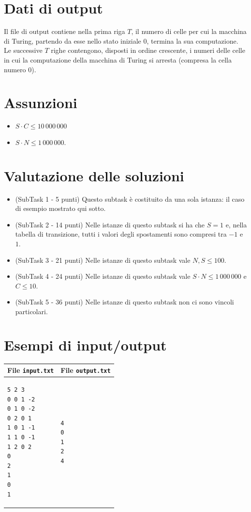 \documentclass[a4paper,11pt]{article}
\begin{document}
\section*{Dati di output}
  
Il file di output contiene nella prima riga $T$, il numero di celle per
cui la macchina di Turing, partendo da esse nello stato iniziale $0$,
termina la sua computazione. Le successive $T$ righe contengono,
disposti in ordine crescente, i numeri delle celle in cui la
computazione della macchina di Turing si arresta (compresa la cella
numero $0$).
    
\section*{Assunzioni}

\begin{itemize}
  \item $S\cdot C \le 10\,000\,000$
  \item $S\cdot N \le 1\,000\,000$.
\end{itemize}

\section*{Valutazione delle soluzioni}

\begin{itemize}
  \item (SubTask 1 - 5 punti) Questo subtask è costituito da una sola
    istanza: il caso di esempio mostrato qui sotto.
  \item (SubTask 2 - 14 punti) Nelle istanze di questo subtask si ha che
    $S=1$ e, nella tabella di transizione, tutti i valori degli
    spostamenti sono compresi tra $-1$ e $1$.
  \item (SubTask 3 - 21 punti) Nelle istanze di questo subtask vale $N,
    S ≤ 100$.
  \item (SubTask 4 - 24 punti) Nelle istanze di questo subtask vale
    $S\cdot N \le 1\,000\,000$ e $C ≤ 10$.
  \item (SubTask 5 - 36 punti) Nelle istanze di questo subtask non ci
    sono vincoli particolari.
\end{itemize}

\section*{Esempi di input/output}
    \noindent
    \begin{tabular}{p{11cm}|p{5cm}}
    \toprule
    \textbf{File \texttt{input.txt}}
    & \textbf{File \texttt{output.txt}}
    \\
    \midrule
    \scriptsize
    \begin{verbatim}
5 2 3
0 0 1 -2
0 1 0 -2
0 2 0 1
1 0 1 -1
1 1 0 -1
1 2 0 2
0
2
1
0
1
      \end{verbatim}
    &
    \scriptsize
    \begin{verbatim}
4
0
1
2
4
      \end{verbatim}
    \\
    \bottomrule
    \end{tabular}
\end{document}
